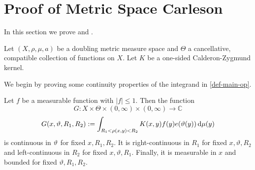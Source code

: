 \chapter{Proof of Metric Space Carleson}
\label{thmfromproplinear}

In this section we prove  and .

Let $(X, \rho, \mu, a)$ be a doubling metric measure space and $\Theta$ a cancellative, compatible collection of functions on $X$. Let $K$ be a one-sided Calderon-Zygmund kernel.

We begin by proving some continuity properties of the integrand in \eqref{def-main-op}.

\begin{lemma}
    \label{int-continuous}
    \leanok
    Let $f$ be a measurable function with $|f| \le 1$. Then the function
    \[
        G: X \times \Theta \times (0,\infty) \times (0, \infty) \to \mathbb{C}
    \]
    \[
        G(x, {\vartheta}, R_1, R_2) := \int_{R_1 < \rho(x,y) < R_2} K(x,y) f(y) e({\vartheta}(y)) \, \mathrm{d}\mu(y)
    \]
    is continuous in ${\vartheta}$ for fixed $x, R_1, R_2$. It is right-continuous in $R_1$ for fixed $x, \vartheta, R_2$ and left-continuous in $R_2$ for fixed $x, \vartheta, R_1$. Finally, it is measurable in $x$ and bounded for fixed $\vartheta, R_1, R_2$.
\end{lemma}

